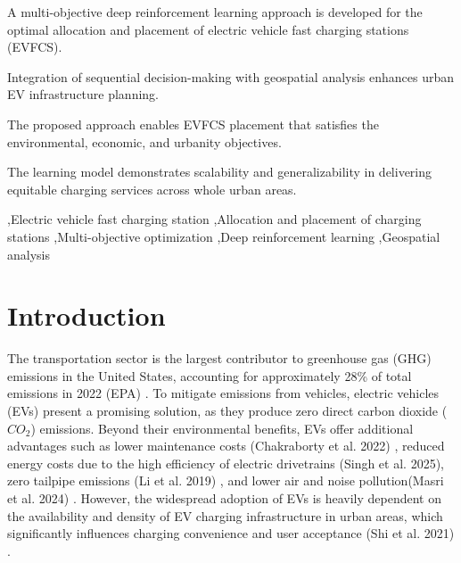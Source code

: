 \documentclass[preprint,12pt]{elsarticle}
\begin{document}
\begin{frontmatter}
\begin{highlights}
\item A multi-objective deep reinforcement learning approach is developed for the optimal allocation and placement of electric vehicle fast charging stations (EVFCS).
\item Integration of sequential decision-making with geospatial analysis enhances urban EV infrastructure planning.
\item The proposed approach enables EVFCS placement that satisfies the environmental, economic, and urbanity objectives. 
\item The learning model demonstrates scalability and generalizability in delivering equitable charging services across whole urban areas. 
\end{highlights}

\begin{keyword}
\sep Electric vehicle fast charging station \sep Allocation and placement of charging stations \sep Multi-objective optimization \sep Deep reinforcement learning \sep Geospatial analysis
\end{keyword}

\end{frontmatter}



\section{Introduction}
The transportation sector is the largest contributor to greenhouse gas (GHG) emissions in the United States, accounting for approximately 28\% of total emissions in 2022 (EPA) \cite{EPA2022}. To mitigate emissions from vehicles, electric vehicles (EVs) present a promising solution, as they produce zero direct carbon dioxide ($CO_2$) emissions. Beyond their environmental benefits, EVs offer additional advantages such as lower maintenance costs (Chakraborty et al. 2022) \cite{Chakr2022}, reduced energy costs due to the high efficiency of electric drivetrains (Singh et al. 2025)\cite{Singh2025}, zero tailpipe emissions (Li et al. 2019) \cite{Li_kha2019}, and lower air and noise pollution(Masri et al. 2024) \cite{Masri2024}. However, the widespread adoption of EVs is heavily dependent on the availability and density of EV charging infrastructure in urban areas, which significantly influences charging convenience and user acceptance (Shi et al. 2021) \cite{Shi_Hao2021}. 
\end{document}

